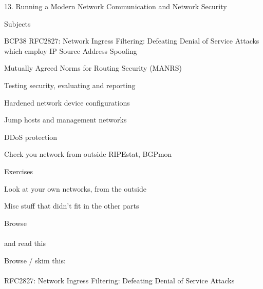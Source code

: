 \documentclass[Screen16to9,17pt]{foils}
\begin{document}
\mytitlepage
{13. Running a Modern Network}
{Communication and Network Security \the\year}



\begin{list1}
\item Subjects
\begin{list2}
\item BCP38 RFC2827: Network Ingress Filtering: Defeating Denial of Service Attacks\\
 which employ IP Source Address Spoofing
\item Mutually Agreed Norms for Routing Security (MANRS)
\item Testing security, evaluating and reporting
\item Hardened network device configurations
\item Jump hosts and management networks
\item DDoS protection
\item Check you network from outside RIPEstat, BGPmon
\end{list2}
\item Exercises
\begin{list2}
\item Look at your own networks, from the outside
\end{list2}
\end{list1}


Misc stuff that didn't fit in the other parts \smiley


\begin{list1}
\item Browse\\
{\small{}}\\
and read this\\ {\small{}}
\item Browse / skim this:\\
{\small{}}\\
RFC2827: Network Ingress Filtering: Defeating Denial of Service Attacks
\end{list1}


\end{document}
